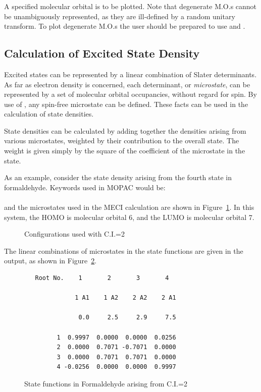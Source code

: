 \subsubsection*{}
A specified molecular orbital is to be plotted. Note that degenerate M.O.s
cannot be unambiguously represented, as they are ill-defined by a random
unitary transform. To plot degenerate M.O.s the user should be prepared to use
 and .

\subsection{Calculation of Excited State Density}
Excited states can be represented by a linear combination of Slater
determinants.  As far as electron density is concerned, each determinant, or
{\em microstate}, can be represented by a set of molecular orbital occupancies,
without regard for spin.  By use of , any spin-free microstate
can be defined.  These facts can be used in the calculation of state densities.

State densities can be calculated by adding together the densities arising from
various microstates, weighted by their contribution to the overall state.
The weight is given simply by the square of the coefficient of the microstate
in the state.

As an example, consider the state density arising from the fourth state in
formaldehyde.  Keywords used in MOPAC would be:\\  \\ and the microstates used in the MECI
calculation are shown in Figure~\ref{fourth}. In this system, the HOMO is
molecular orbital 6, and the LUMO is molecular orbital 7.

\begin{figure}
\begin{makeimage}
\end{makeimage}
\begin{center}

\end{center}
\caption{\label{fourth}Configurations used with C.I.=2}
\end{figure}

The linear combinations of microstates in the state functions are given in the
output, as shown in Figure~\ref{ci_output}.

\begin{figure}
\begin{makeimage}
\end{makeimage}
\begin{verbatim}
   Root No.    1       2       3       4

              1 A1    1 A2    2 A2    2 A1

               0.0     2.5     2.9     7.5

         1  0.9997  0.0000  0.0000  0.0256
         2  0.0000  0.7071 -0.7071  0.0000
         3  0.0000  0.7071  0.7071  0.0000
         4 -0.0256  0.0000  0.0000  0.9997
\end{verbatim}
\caption{\label{ci_output}State functions in Formaldehyde arising from C.I.=2}
\end{figure}

